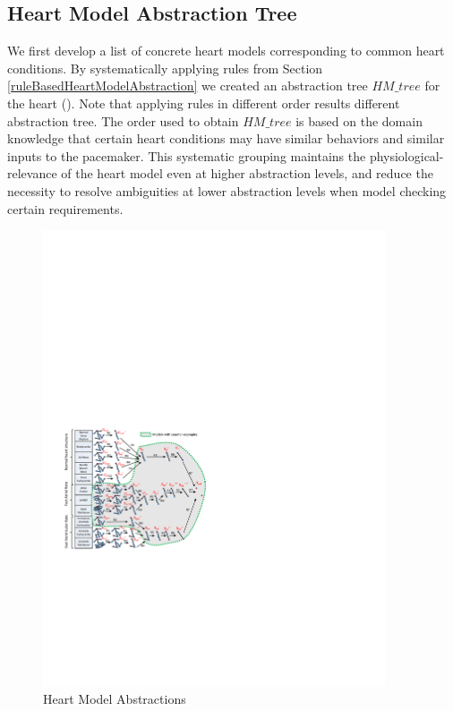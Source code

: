 \subsection{Heart Model Abstraction Tree}
We first develop a list of concrete heart models corresponding to common heart conditions. By systematically applying rules from Section \ref{ruleBasedHeartModelAbstraction} we created an abstraction tree $HM\_tree$ for the heart (). Note that applying rules in different order results different abstraction tree. The order used to obtain $HM\_tree$ is based on the domain knowledge that certain heart conditions may have similar behaviors and similar inputs to the pacemaker. This systematic grouping maintains the physiological-relevance of the heart model even at higher abstraction levels, and reduce the necessity to resolve ambiguities at lower abstraction levels when model checking certain requirements.
\begin{figure}[!t]
		\centering
		\includegraphics[width=0.9\textwidth]{figs/abs.pdf}
		\caption{\small Heart Model Abstractions}
		\label{fig:HM_abs}
\end{figure}

